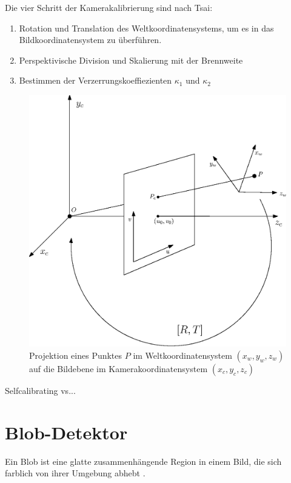 Die vier Schritt der Kamerakalibrierung sind nach Tsai\cite{Tsai1987}:
\begin{enumerate}
	\item Rotation und Translation des Weltkoordinatensystems, um es in das Bildkoordinatensystem zu überführen.
	\item Perspektivische Division und Skalierung mit der Brennweite
	\item Bestimmen der Verzerrungskoeffiezienten $\kappa_1$ und $\kappa_2$
\end{enumerate}

\begin{figure}[!htb]
	\centering
	\includegraphics[scale=.8]{images/pinhole.eps}
	\caption{Projektion eines Punktes $P$ im Weltkoordinatensystem $(x_w, y_w, z_w)$ auf die Bildebene im Kamerakoordinatensystem  $(x_c, y_c, z_c)$}
	\label{fig:extrinsic}
\end{figure}



Selfcalibrating vs...




\section{Blob-Detektor}
\label{s:blob}
\begin{definition}[Blob]\label{def:blob}
	Ein Blob ist eine glatte zusammenhängende Region in einem Bild, die sich farblich von ihrer Umgebung abhebt \cite{Lindeberg1993}.
\end{definition}

